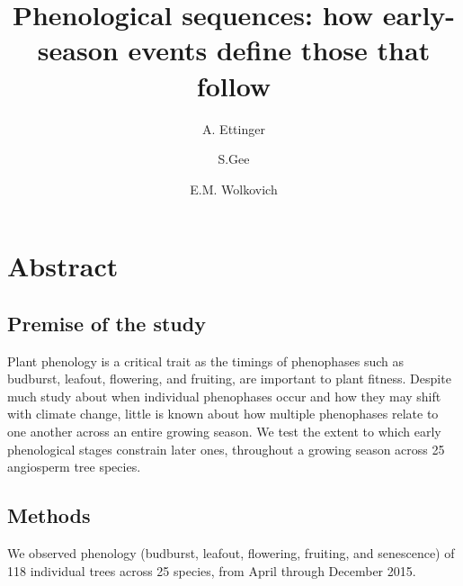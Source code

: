 \documentclass{article}
\begin{document}

\title{Phenological sequences: how early-season events define those that follow} %
\author[1,2,a]{A. Ettinger}
\author[1]{S.Gee}
\author[1,3]{E.M. Wolkovich}

\maketitle %


\section*{Abstract}
\subsection*{Premise of the study}
Plant phenology is a critical trait as the timings of phenophases such as budburst, leafout, flowering, and fruiting, are important to plant fitness. Despite much study about when individual phenophases occur and how they may shift with climate change, little is known about how multiple phenophases relate to one another across an entire growing season. We test the extent to which early phenological stages constrain later ones, throughout a growing season across 25 angiosperm tree species. 
\subsection*{Methods}
We observed phenology (budburst, leafout, flowering, fruiting, and senescence) of 118 individual trees across 25 species, from April through December 2015. 
\end{document}
